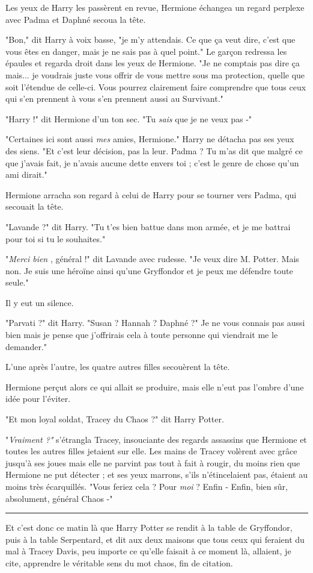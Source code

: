 Les yeux de Harry les passèrent en revue, Hermione échangea un regard perplexe avec Padma et Daphné secoua la tête.

"Bon," dit Harry à voix basse, "je m'y attendais. Ce que ça veut dire, c'est que vous êtes en danger, mais je ne sais pas à quel point." Le garçon redressa les épaules et regarda droit dans les yeux de Hermione. "Je ne comptais pas dire ça mais... je voudrais juste vous offrir de vous mettre sous ma protection, quelle que soit l'étendue de celle-ci. Vous pourrez clairement faire comprendre que tous ceux qui s'en prennent à vous s'en prennent aussi au Survivant."

"Harry !" dit Hermione d'un ton sec. "Tu \emph{sais}  que je ne veux pas -"

"Certaines ici sont aussi \emph{mes}  amies, Hermione." Harry ne détacha pas ses yeux des siens. "Et c'est leur décision, pas la leur. Padma ? Tu m'as dit que malgré ce que j'avais fait, je n'avais aucune dette envers toi ; c'est le genre de chose qu'un ami dirait."

Hermione arracha son regard à celui de Harry pour se tourner vers Padma, qui secouait la tête.

"Lavande ?" dit Harry. "Tu t'es bien battue dans mon armée, et je me battrai pour toi si tu le souhaites."

"\emph{Merci bien} , général !" dit Lavande avec rudesse. "Je veux dire M. Potter. Mais non. Je suis une héroïne ainsi qu'une Gryffondor et je peux me défendre toute seule."

Il y eut un silence.

"Parvati ?" dit Harry. "Susan ? Hannah ? Daphné ?" Je ne vous connais pas aussi bien mais je pense que j'offrirais cela à toute personne qui viendrait me le demander."

L'une après l'autre, les quatre autres filles secouèrent la tête.

Hermione perçut alors ce qui allait se produire, mais elle n'eut pas l'ombre d'une idée pour l'éviter.

"Et mon loyal soldat, Tracey du Chaos ?" dit Harry Potter.

"\emph{Vraiment ?"}  s'étrangla Tracey, insouciante des regards assassins que Hermione et toutes les autres filles jetaient sur elle. Les mains de Tracey volèrent avec grâce jusqu'à ses joues mais elle ne parvint pas tout à fait à rougir, du moins rien que Hermione ne put détecter ; et ses yeux marrons, s'ils n'étincelaient pas, étaient au moins très écarquillés. "Vous feriez cela ? Pour \emph{moi}  ? Enfin - Enfin, bien sûr, absolument, général Chaos -"
\par\noindent\rule{\textwidth}{0.4pt}
Et c'est donc ce matin là que Harry Potter se rendit à la table de Gryffondor, puis à la table Serpentard, et dit aux deux maisons que tous ceux qui feraient du mal à Tracey Davis, peu importe ce qu'elle faisait à ce moment là, allaient, je cite, apprendre le véritable sens du mot chaos, fin de citation.

